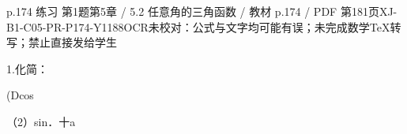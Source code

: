 \begin{bankitem}{p.174 练习 第1题}{第5章 / 5.2 任意角的三角函数 / 教材 p.174 / PDF 第181页}{XJ-B1-C05-PR-P174-Y1188}{OCR未校对：公式与文字均可能有误；未完成数学TeX转写；禁止直接发给学生}
\begin{ocrdraft}
\par
1.化简：
\par
(Dcos
\par
（2）sin．十a
\end{ocrdraft}
\end{bankitem}
